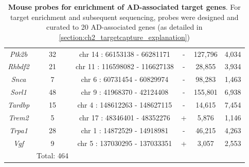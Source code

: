 \begin{table}[ht]
\begin{tabular}{@{}cccccc@{}}
		\textit{Ptk2b}  & 32         & chr  14 : 66153138 -   66281171   & - & 127,796 & 4,034  \\
		\textit{Rhbdf2} & 21         & chr  11 : 116598082 -   116627138 & - & 28,855  & 3,934  \\
		\textit{Snca}   & 7          & chr  6 : 60731454 -   60829974    & - & 98,283  & 1,463  \\
		\textit{Sorl1}  & 48         & chr  9 : 41968370 -   42124408    & - & 155,801 & 6,938  \\
		\textit{Tardbp} & 15         & chr  4 : 148612263 -   148627115  & - & 14,615  & 7,454  \\
		\textit{Trem2}  & 5          & chr  17 : 48346401 -   48352276   & + & 5,876   & 1,146  \\
		\textit{Trpa1}  & 28         & chr  1 : 14872529 -   14918981    & - & 46,215  & 4,263  \\
		\textit{Vgf}    & 9          & chr  5 : 137030295 -   137033351  & + & 3,057   & 2,553  \\
		& Total: 464 &                                   &   &         &        \\ \bottomrule
	\end{tabular}
\caption[Mouse probes for enrichment of AD-associated target genes]%
{\textbf{Mouse probes for enrichment of AD-associated target genes}. For target enrichment and subsequent sequencing, probes were designed and curated to 20 AD-associated genes (as detailed in \cref{section:ch2_targetcapture_explanation})}
\label{tab:mouse_probes}
\end{table}


